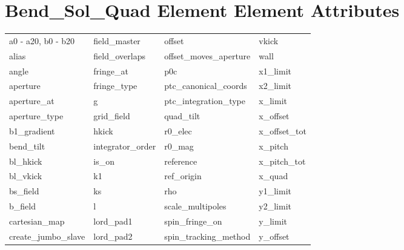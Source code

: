  \section{Bend_Sol_Quad Element Element Attributes}
 \label{s:list.bend.sol.quad}
 
 \begin{tabular}{llll} \toprule
a0 - a20, b0 - b20          & field_master                & offset                      & vkick                       \\
alias                       & field_overlaps              & offset_moves_aperture       & wall                        \\
angle                       & fringe_at                   & p0c                         & x1_limit                    \\
aperture                    & fringe_type                 & ptc_canonical_coords        & x2_limit                    \\
aperture_at                 & g                           & ptc_integration_type        & x_limit                     \\
aperture_type               & grid_field                  & quad_tilt                   & x_offset                    \\
b1_gradient                 & hkick                       & r0_elec                     & x_offset_tot                \\
bend_tilt                   & integrator_order            & r0_mag                      & x_pitch                     \\
bl_hkick                    & is_on                       & reference                   & x_pitch_tot                 \\
bl_vkick                    & k1                          & ref_origin                  & x_quad                      \\
bs_field                    & ks                          & rho                         & y1_limit                    \\
b_field                     & l                           & scale_multipoles            & y2_limit                    \\
cartesian_map               & lord_pad1                   & spin_fringe_on              & y_limit                     \\
create_jumbo_slave          & lord_pad2                   & spin_tracking_method        & y_offset                    \\

\end{tabular}
